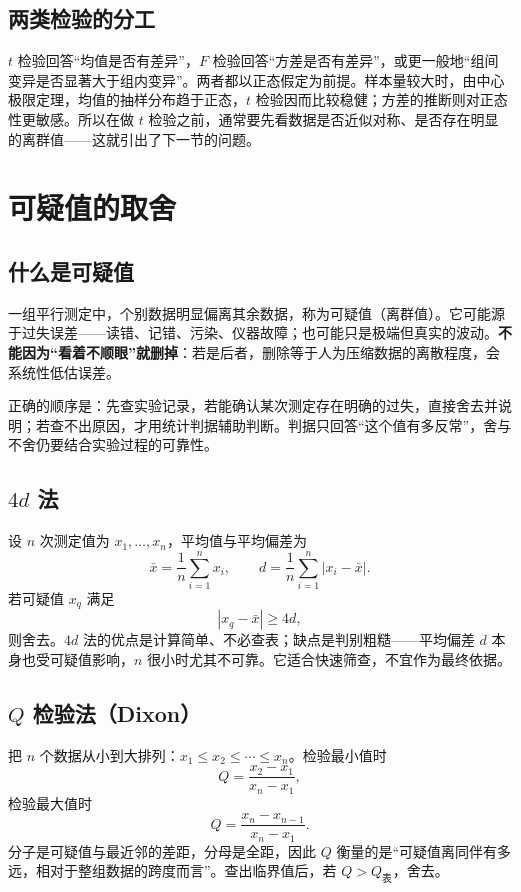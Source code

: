 \documentclass[UTF8]{ctexbook}
\begin{document}
\subsection{两类检验的分工}

$t$ 检验回答“均值是否有差异”，$F$ 检验回答“方差是否有差异”，或更一般地“组间变异是否显著大于组内变异”。两者都以正态假定为前提。样本量较大时，由中心极限定理，均值的抽样分布趋于正态，$t$ 检验因而比较稳健；方差的推断则对正态性更敏感。所以在做 $t$ 检验之前，通常要先看数据是否近似对称、是否存在明显的离群值——这就引出了下一节的问题。

\section{可疑值的取舍}

\subsection{什么是可疑值}

一组平行测定中，个别数据明显偏离其余数据，称为可疑值（离群值）。它可能源于过失误差——读错、记错、污染、仪器故障；也可能只是极端但真实的波动。\textbf{不能因为“看着不顺眼”就删掉}：若是后者，删除等于人为压缩数据的离散程度，会系统性低估误差。

正确的顺序是：先查实验记录，若能确认某次测定存在明确的过失，直接舍去并说明；若查不出原因，才用统计判据辅助判断。判据只回答“这个值有多反常”，舍与不舍仍要结合实验过程的可靠性。

\subsection{$4d$ 法}

设 $n$ 次测定值为 $x_1,\dots,x_n$，平均值与平均偏差为
\[
\bar x=\frac{1}{n}\sum_{i=1}^{n}x_i,
\qquad
d=\frac{1}{n}\sum_{i=1}^{n}|x_i-\bar x|.
\]
若可疑值 $x_q$ 满足
\[
|x_q-\bar x|\ge 4d,
\]
则舍去。$4d$ 法的优点是计算简单、不必查表；缺点是判别粗糙——平均偏差 $d$ 本身也受可疑值影响，$n$ 很小时尤其不可靠。它适合快速筛查，不宜作为最终依据。

\subsection{$Q$ 检验法（Dixon）}

把 $n$ 个数据从小到大排列：$x_1\le x_2\le\cdots\le x_n$。检验最小值时
\[
Q=\frac{x_2-x_1}{x_n-x_1},
\]
检验最大值时
\[
Q=\frac{x_n-x_{n-1}}{x_n-x_1}.
\]
分子是可疑值与最近邻的差距，分母是全距，因此 $Q$ 衡量的是“可疑值离同伴有多远，相对于整组数据的跨度而言”。查出临界值后，若 $Q>Q_{\text{表}}$，舍去。
\end{document}
